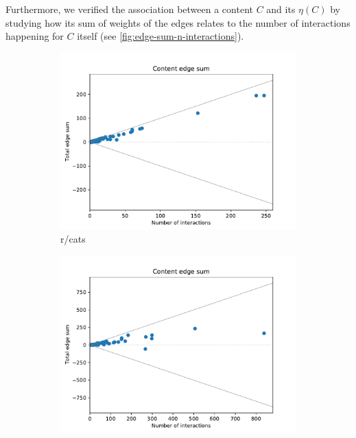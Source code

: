 \bigskip
Furthermore, we verified the association between a content $C$ and its
$\eta(C)$ by studying how its sum of weights of the edges relates to the number
of interactions happening for $C$ itself (see \autoref{fig:edge-sum-n-interactions}).

\begin{figure}
	\begin{center}
		\begin{subfigure}[b]{0.4\textwidth}
			\centering
			\includegraphics[width=\textwidth]{tex/out/cats200/edge-sum-n-interactions.pdf}
			\caption{r/cats}
			\label{fig:tex/out/cats200/edge-sum-n-interactions.pdf}
		\end{subfigure}
		\begin{subfigure}[b]{0.4\textwidth}
			\centering
			\includegraphics[width=\textwidth]{tex/out/covid19200/edge-sum-n-interactions.pdf}

\end{subfigure}
\end{center}
\end{figure}
